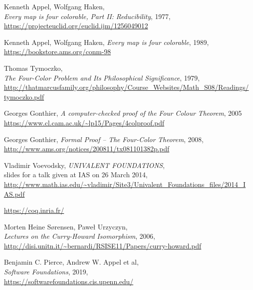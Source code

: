 \documentclass[declaration,inz,english,shortabstract]{iithesis}
\begin{document}
\begin{thebibliography}{1}
        Kenneth Appel, Wolfgang Haken, \\
        \textit{Every  map  is  four  colorable,  Part  II:  Reducibility}, 1977, \\
        \url{https://projecteuclid.org/euclid.ijm/1256049012}

        Kenneth Appel, Wolfgang Haken,
        \textit{Every  map  is  four  colorable}, 1989, \\
        \url{https://bookstore.ams.org/conm-98}

        Thomas Tymoczko, \\
        \textit{The Four-Color Problem and Its Philosophical Significance}, 1979, \\
        \url{http://thatmarcusfamily.org/philosophy/Course_Websites/Math_S08/Readings/tymoczko.pdf}

        Georges Gonthier,
        \textit{A computer-checked proof of the Four Colour Theorem}, 2005 \\
        \url{https://www.cl.cam.ac.uk/~lp15/Pages/4colproof.pdf}
    
        Georges Gonthier,
        \textit{Formal Proof -- The Four-Color Theorem}, 2008, \\
        \url{http://www.ams.org/notices/200811/tx081101382p.pdf}

        Vladimir Voevodsky,
        \textit{UNIVALENT FOUNDATIONS}, \\
        slides for a talk given at IAS on 26 March 2014, \\
        \url{http://www.math.ias.edu/~vladimir/Site3/Univalent_Foundations_files/2014_IAS.pdf}

        \url{https://coq.inria.fr/}

        Morten Heine Sørensen, Paweł Urzyczyn, \\
        \textit{Lectures on the Curry-Howard Isomorphism}, 2006, \\
        \url{http://disi.unitn.it/~bernardi/RSISE11/Papers/curry-howard.pdf}
    
        Benjamin C. Pierce, Andrew W. Appel et al, \\
        \textit{Software Foundations}, 2019, \\
        \url{https://softwarefoundations.cis.upenn.edu/}
    

\end{thebibliography}
\end{document}
